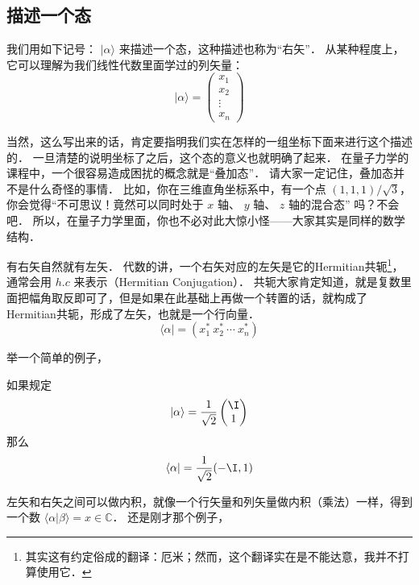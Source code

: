 
\subsection{描述一个态}

我们用如下记号： $|\alpha\rangle$ 来描述一个态，这种描述也称为“右矢”． 从某种程度上，它可以理解为我们线性代数里面学过的列矢量：
\begin{equation}
|\alpha\rangle = \left(\begin{matrix}x_1\\x_2\\ \vdots\\ x_n\end{matrix}\right)
\end{equation}

当然，这么写出来的话，肯定要指明我们实在怎样的一组坐标下面来进行这个描述的． 一旦清楚的说明坐标了之后，这个态的意义也就明确了起来． 在量子力学的课程中，一个很容易造成困扰的概念就是“叠加态”． 请大家一定记住，叠加态并不是什么奇怪的事情． 比如，你在三维直角坐标系中，有一个点 $(1, 1, 1)/\sqrt3$，你会觉得“不可思议！竟然可以同时处于 $x$ 轴、 $y$ 轴、 $z$ 轴的混合态” 吗？不会吧． 所以，在量子力学里面，你也不必对此大惊小怪——大家其实是同样的数学结构．

有右矢自然就有左矢． 代数的讲，一个右矢对应的左矢是它的Hermitian共轭\footnote{其实这有约定俗成的翻译：厄米；然而，这个翻译实在是不能达意，我并不打算使用它．}，通常会用 $h. c$ 来表示（Hermitian Conjugation）． 共轭大家肯定知道，就是复数里面把幅角取反即可了，但是如果在此基础上再做一个转置的话，就构成了Hermitian共轭，形成了左矢，也就是一个行向量．
\begin{equation}
\langle\alpha| = (x_1^*\ x_2^*\ \cdots\ x_n^*)
\end{equation}

举一个简单的例子，

\begin{example}{}
如果规定
\begin{equation}
|\alpha\rangle = \frac{1}{\sqrt{2}}\left(\begin{matrix}\I \\1\end{matrix}\right) 
\end{equation}
那么
\begin{equation}
\langle\alpha| = \frac{1}{\sqrt{2}}(-\I, 1)
\end{equation}
\end{example}

左矢和右矢之间可以做内积，就像一个行矢量和列矢量做内积（乘法）一样，得到一个数 $\langle\alpha|\beta\rangle = x \in \mathbb{C}$． 还是刚才那个例子，

